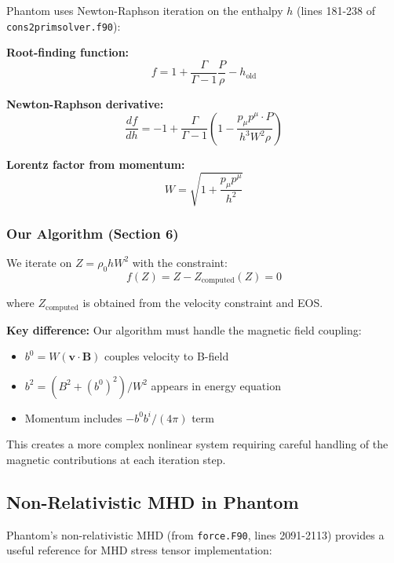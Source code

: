 \documentclass[12pt,a4paper]{article}
\begin{document}
Phantom uses Newton-Raphson iteration on the enthalpy $h$ (lines 181-238 of
\texttt{cons2primsolver.f90}):

\textbf{Root-finding function:}
\begin{equation}
f = 1 + \frac{\Gamma}{\Gamma-1}\frac{P}{\rho} - h_\text{old}
\end{equation}

\textbf{Newton-Raphson derivative:}
\begin{equation}
\frac{df}{dh} = -1 + \frac{\Gamma}{\Gamma-1}\left(1 - \frac{p_\mu p^\mu \cdot P}
{h^3 W^2 \rho}\right)
\end{equation}

\textbf{Lorentz factor from momentum:}
\begin{equation}
W = \sqrt{1 + \frac{p_\mu p^\mu}{h^2}}
\end{equation}

\subsubsection{Our Algorithm (Section 6)}

We iterate on $Z = \rho_0 h W^2$ with the constraint:
\begin{equation}
f(Z) = Z - Z_\text{computed}(Z) = 0
\end{equation}

where $Z_\text{computed}$ is obtained from the velocity constraint and EOS.

\textbf{Key difference:} Our algorithm must handle the magnetic field coupling:
\begin{itemize}
    \item $b^0 = W (\bm{v} \cdot \bm{B})$ couples velocity to B-field
    \item $b^2 = (B^2 + (b^0)^2)/W^2$ appears in energy equation
    \item Momentum includes $-b^0 b^i/(4\pi)$ term
\end{itemize}

This creates a more complex nonlinear system requiring careful handling of the
magnetic contributions at each iteration step.

\subsection{Non-Relativistic MHD in Phantom}

Phantom's non-relativistic MHD (from \texttt{force.F90}, lines 2091-2113) provides
a useful reference for MHD stress tensor implementation:
\end{document}
